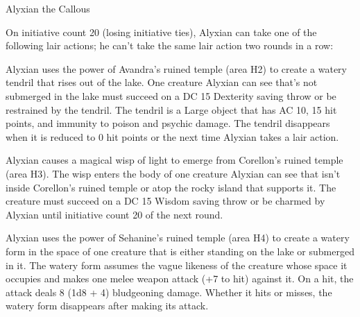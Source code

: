 \documentclass[10pt,a4paper,twoside,twocolumn,openany,nodeprecatedcode]{dndbook}
\begin{document}
\begin{DndMonster}[float=ht]{Alyxian the Callous}
\begin{DndMonsterLegendaryActions}
\end{DndMonsterLegendaryActions}
\par {}
On initiative count 20 (losing initiative ties), Alyxian can take one of the following lair actions; he can't take the same lair action two rounds in a row:


\begin{description}[nolistsep]
\item[Avandra's Grasp]
Alyxian uses the power of Avandra's ruined temple (area H2) to create a watery tendril that rises out of the lake. One creature Alyxian can see that's not submerged in the lake must succeed on a DC 15 Dexterity saving throw or be restrained by the tendril. The tendril is a Large object that has AC 10, 15 hit points, and immunity to poison and psychic damage. The tendril disappears when it is reduced to 0 hit points or the next time Alyxian takes a lair action.

\item[Corellon's Charm]
Alyxian causes a magical wisp of light to emerge from Corellon's ruined temple (area H3). The wisp enters the body of one creature Alyxian can see that isn't inside Corellon's ruined temple or atop the rocky island that supports it. The creature must succeed on a DC 15 Wisdom saving throw or be charmed by Alyxian until initiative count 20 of the next round.

\item[Sehanine's Torment]
Alyxian uses the power of Sehanine's ruined temple (area H4) to create a watery form in the space of one creature that is either standing on the lake or submerged in it. The watery form assumes the vague likeness of the creature whose space it occupies and makes one melee weapon attack (+7 to hit) against it. On a hit, the attack deals 8 (1d8 + 4) bludgeoning damage. Whether it hits or misses, the watery form disappears after making its attack.


\end{description}
\end{DndMonster}
\end{document}
